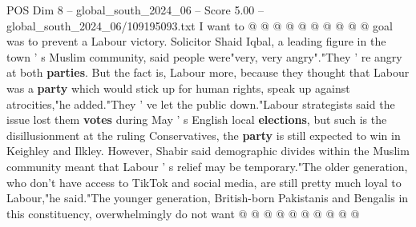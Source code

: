 \begin{textsample}{POS Dim 8 – global\_south\_2024\_06 – Score 5.00 – global\_south\_2024\_06/109195093.txt}
I want to @ @ @ @ @ @ @ @ @ @ goal was to prevent a Labour victory.
Solicitor Shaid Iqbal, a leading figure in the town ' s Muslim community, said people were"very, very angry"."They ' re angry at both \textbf{parties}.
But the fact is, Labour more, because they thought that Labour was a \textbf{party} which would stick up for human rights, speak up against atrocities,"he added."They ' ve let the public down."Labour strategists said the issue lost them \textbf{votes} during May ' s English local \textbf{elections}, but such is the disillusionment at the ruling Conservatives, the \textbf{party} is still expected to win in Keighley and Ilkley.
However, Shabir said demographic divides within the Muslim community meant that Labour ' s relief may be temporary."The older generation, who don't have access to TikTok and social media, are still pretty much loyal to Labour,"he said."The younger generation, British-born Pakistanis and Bengalis in this constituency, overwhelmingly do not want @ @ @ @ @ @ @ @ @ @

\end{textsample}
